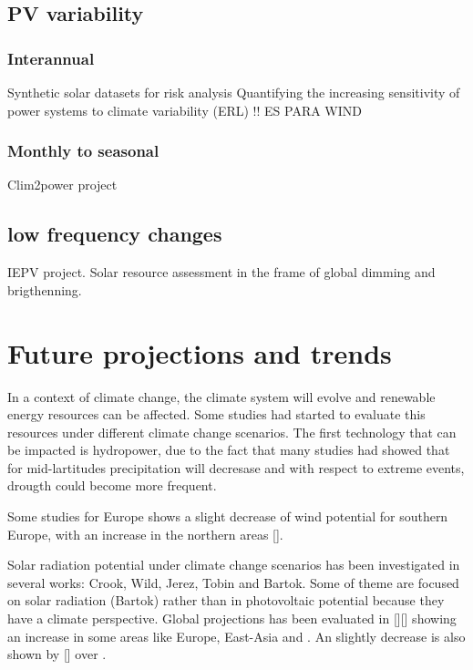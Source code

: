 

\subsection{PV variability}
\subsubsection{Interannual}
Synthetic solar datasets for risk analysis
Quantifying the increasing sensitivity of power systems to climate variability (ERL) !! ES PARA WIND
\subsubsection{Monthly to seasonal}
Clim2power project
\subsection{low frequency changes}
IEPV project.
Solar resource assessment in the frame of global dimming and brigthenning.
\section{Future projections and trends}

In a context of climate change, the climate system will evolve and renewable energy resources can be affected. Some studies had started to evaluate this resources under different climate change scenarios. The first technology that can be impacted is hydropower, due to the fact that many studies had showed that for mid-lartitudes precipitation will decresase and with respect to extreme events, drougth could become more frequent.

Some studies for Europe shows a slight decrease of wind potential for southern Europe, with an increase in the northern areas [].

Solar radiation potential under climate change scenarios has been investigated in several works: Crook, Wild, Jerez, Tobin and Bartok. Some of theme are focused on solar radiation (Bartok) rather than in photovoltaic potential because they have a climate perspective. Global projections has been evaluated in [][] showing an increase in some areas like Europe, East-Asia and . An slightly decrease is also shown by [] over .

